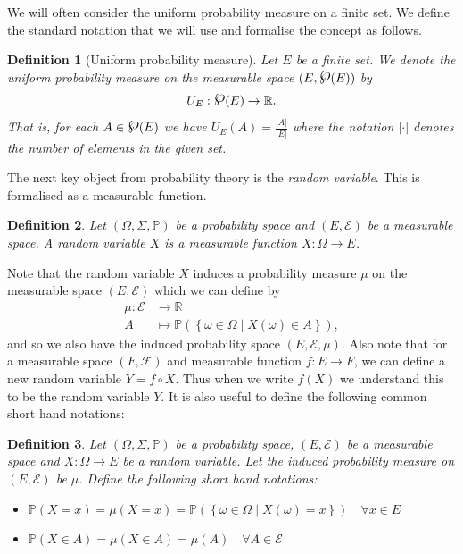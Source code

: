\documentclass{article}
\newcommand{\powerset}{\raisebox{.15\baselineskip}{\Large\ensuremath{\wp}}}
\newcommand{\set}[2]{\left\{ #1 \middle| #2 \right\}}
\newtheorem{definition}{Definition}
\theoremstyle{remark}
\renewcommand{\P}{\mathbb{P}}
\begin{document}
We will often consider the uniform probability measure on a finite set. We
define the standard notation that we will use and formalise the concept as
follows.

\begin{definition}[Uniform probability measure]
	Let $E$ be a finite set. We denote the uniform probability measure on the
	measurable space $(E, \powerset(E))$ by
	\begin{align*}
		U_E: \powerset(E) \to \mathbb{R}.
	\end{align*}
	That is, for each $A \in \powerset(E)$ we have $U_E(A) = \frac{|A|}{|E|}$
	where the notation $|\cdot|$ denotes the number of elements in the given
	set.
\end{definition}

The next key object from probability theory is the \textit{random variable}.
This is formalised as a measurable function.

\begin{definition}
	Let $(\Omega, \Sigma, \P)$ be a probability space and $(E, \mathcal{E})$ be
	a measurable space. A random variable $X$ is a measurable function $X:
	\Omega \to E$.
\end{definition}

Note that the random variable $X$ induces a probability measure $\mu$ on the
measurable space $(E, \mathcal{E})$ which we can define by
\begin{align*}
	\mu: \mathcal{E} &\to \mathbb{R}\\
	A &\mapsto \P(\set{\omega \in \Omega}{X(\omega) \in A}),
\end{align*}
and so we also have the induced probability space $(E, \mathcal{E}, \mu)$. Also
note that for a measurable space $(F, \mathcal{F})$ and measurable function $f:
E \to F$, we can define a new random variable $Y = f \circ X$. Thus when we
write $f(X)$ we understand this to be the random variable $Y$. It is also
useful to define the following common short hand notations:

\begin{definition}
	Let $(\Omega, \Sigma, \P)$ be a probability space, $(E, \mathcal{E})$ be a
	measurable space and $X: \Omega \to E$ be a random variable. Let the
	induced probability measure on $(E, \mathcal{E})$ be $\mu$. Define the
	following short hand notations:
	\begin{itemize}
		\item $\P(X = x) = \mu(X = x) = \P(\set{\omega \in
			\Omega}{X(\omega) = x}) \quad \forall x \in E$
		\item $\P(X \in A) = \mu(X \in A) = \mu(A) \quad \forall A \in
			\mathcal{E}$
	\end{itemize}
\end{definition}
\end{document}
